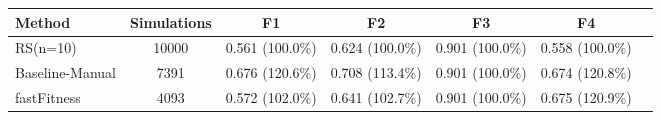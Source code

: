 \begin{tabular}{lcccccc}
\toprule
         Method &  Simulations &              F1 &              F2 &              F3 &              F4 \\
\midrule
       RS(n=10) &        10000 & 0.561 (100.0\%) & 0.624 (100.0\%) & 0.901 (100.0\%) & 0.558 (100.0\%) \\
Baseline-Manual &         7391 & 0.676 (120.6\%) & 0.708 (113.4\%) & 0.901 (100.0\%) & 0.674 (120.8\%) \\
    fastFitness &         4093 & 0.572 (102.0\%) & 0.641 (102.7\%) & 0.901 (100.0\%) & 0.675 (120.9\%) \\
\bottomrule
\end{tabular}
